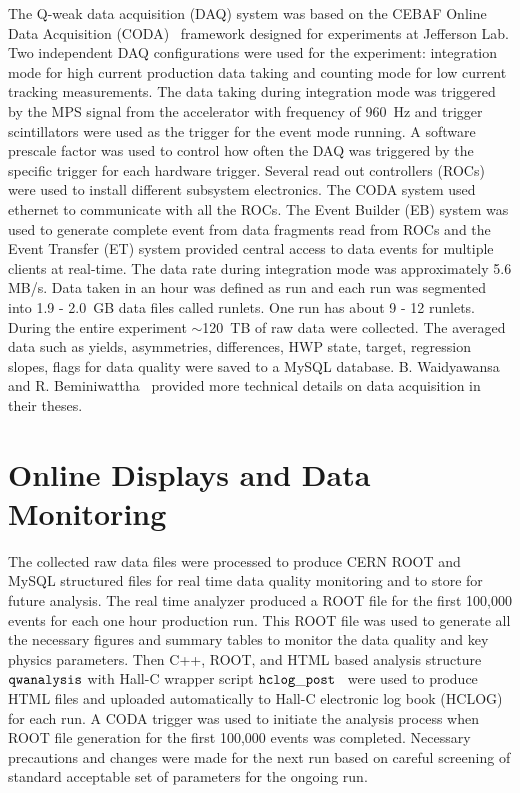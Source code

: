 The Q-weak data acquisition (DAQ) system was based on the CEBAF Online Data Acquisition (CODA)~\cite{website:CODA_wiki,Banta:1997ac} framework designed for experiments at Jefferson Lab. Two independent DAQ configurations were used for the experiment: integration mode for high current production data taking and counting mode for low current tracking measurements. The data taking during integration mode was triggered by the MPS signal from the accelerator with frequency of 960~Hz and trigger scintillators were used as the trigger for the event mode running. A software prescale factor was used to control how often the DAQ was triggered by the specific trigger for each hardware trigger. Several read out controllers (ROCs) were used to install different subsystem electronics. The CODA system used ethernet to communicate with all the ROCs. The Event Builder (EB) system was used to generate complete event from data fragments read from ROCs and the Event Transfer (ET) system provided central access to data events for multiple clients at real-time. The data rate during integration mode was approximately 5.6 MB/s. Data taken in an hour was defined as run and each run was segmented into 1.9 - 2.0~GB data files called runlets. One run has about 9 - 12 runlets. During the entire experiment $\sim$120~TB of raw data were collected. The averaged data such as yields, asymmetries, differences, HWP state, target, regression slopes, flags for data quality were saved to a MySQL database. 
B. Waidyawansa~\cite{buddhini_qweak} and R. Beminiwattha~\cite{rakitha_qweak} provided more technical details on data acquisition in their theses.


\section{Online Displays and Data Monitoring}%
\label{Online Displays and Data Monitoring}

The collected raw data files were processed to produce CERN ROOT and MySQL structured files for real time data quality monitoring and to store for future analysis. The real time analyzer produced a ROOT file for the first 100,000 events for each one hour production run. This ROOT file was used to generate all the necessary figures and summary tables to monitor the data quality and key physics parameters. Then C++, ROOT, and HTML based analysis structure ${ \tt qwanalysis}$ with Hall-C wrapper script ${\tt hclog\_post}$~\cite{brads_communication} were used to produce HTML files and uploaded automatically to Hall-C electronic log book (HCLOG) for each run. A CODA trigger was used to initiate the analysis process when ROOT file generation for the first 100,000 events was completed. Necessary precautions and changes were made for the next run based on careful screening of standard acceptable set of parameters for the ongoing run.

